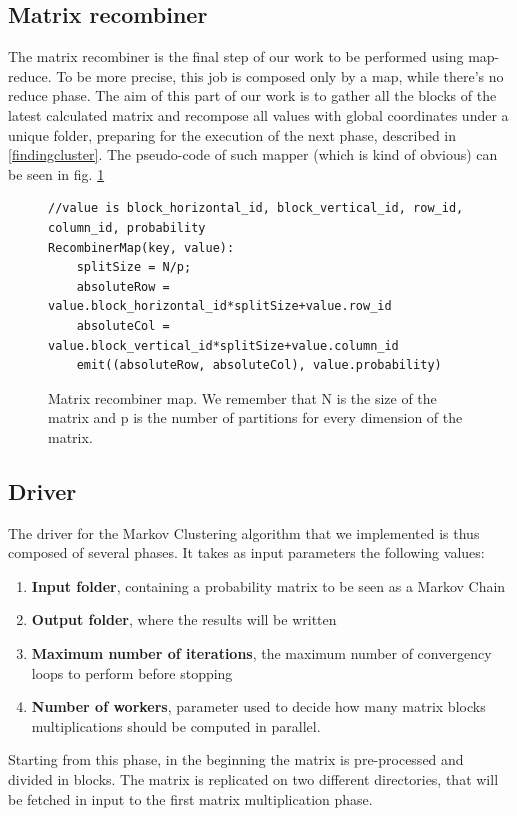 \subsection{Matrix recombiner}
\label{recombiner}
The matrix recombiner is the final step of our work to be performed using map-reduce. To be more precise, this job is composed only
by a map, while there's no reduce phase. The aim of this part of our work is to gather all the blocks of the latest calculated matrix and recompose all values with global coordinates under a unique folder, preparing for the execution of the next phase, described in \ref{findingcluster}. 
The pseudo-code of such mapper (which is kind of obvious) can be seen in fig. \ref{fig:recombiner}
\begin{figure}[H]
\begin{verbatim}
//value is block_horizontal_id, block_vertical_id, row_id, column_id, probability
RecombinerMap(key, value):
    splitSize = N/p;
    absoluteRow = value.block_horizontal_id*splitSize+value.row_id
    absoluteCol = value.block_vertical_id*splitSize+value.column_id
    emit((absoluteRow, absoluteCol), value.probability)
\end{verbatim}
\caption{Matrix recombiner map. We remember that N is the size of the matrix and p is the number of partitions for every dimension of the matrix.}
\label{fig:recombiner}
\end{figure}

\subsection{Driver}
The driver for the Markov Clustering algorithm that we implemented is thus composed of several phases.
It takes as input parameters the following values:
\begin{enumerate}
\item \textbf{Input folder}, containing a probability matrix to be seen as a Markov Chain
\item \textbf{Output folder}, where the results will be written
\item \textbf{Maximum number of iterations}, the maximum number of convergency loops to perform before stopping
\item \textbf{Number of workers}, parameter used to decide how many matrix blocks multiplications should be computed in parallel.
\end{enumerate}
Starting from this phase, in the beginning the matrix is pre-processed and divided in blocks. The matrix is replicated on two different directories, that will be fetched in input to the first matrix multiplication phase.

